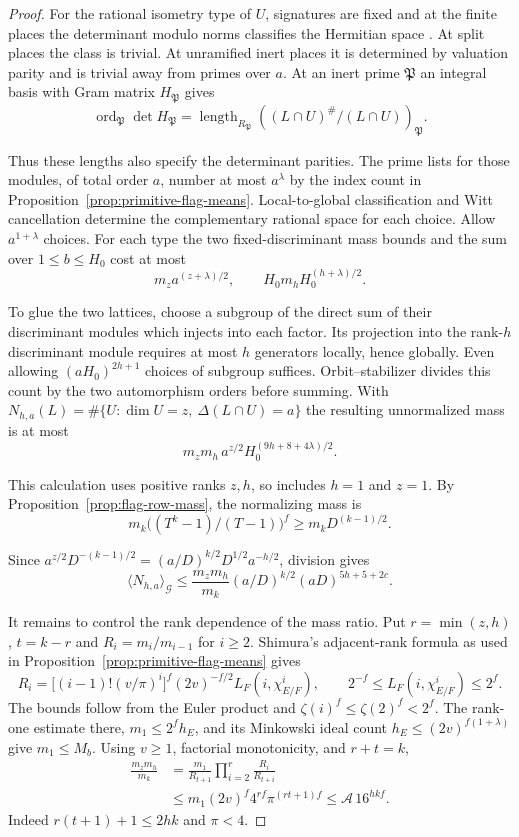 \begin{proof}
For the rational isometry type of \(U\), signatures are fixed and
at the finite places the determinant modulo norms classifies the
Hermitian space \cite{landherr}. At split places the class is trivial. At unramified
inert places it is determined by valuation parity and is trivial
away from primes over \(a\). At an inert prime \(\mathfrak P\)
an integral basis with Gram matrix \(H_{\mathfrak P}\) gives
\[
 \operatorname{ord}_{\mathfrak P}\det H_{\mathfrak P}
 =\operatorname{length}_{R_{\mathfrak P}}
     ((L\cap U)^\#/(L\cap U))_{\mathfrak P}.
\]

Thus these lengths also specify the determinant parities. The prime lists for those modules, of
total order \(a\), number at most \(a^\lambda\) by the index
count in Proposition~\ref{prop:primitive-flag-means}.
Local-to-global classification and Witt cancellation determine the
complementary rational space for each choice. Allow \(a^{1+\lambda}\)
choices. For each type the two fixed-discriminant mass bounds and
the sum over \(1\le b\le H_0\) cost at most
\[
          m_z a^{(z+\lambda)/2},\qquad
          H_0 m_h H_0^{(h+\lambda)/2}.
\]

To glue the two lattices, choose a subgroup of the direct sum of
their discriminant modules which injects into each factor. Its
projection into the rank-\(h\) discriminant module requires at most
\(h\) generators locally, hence globally. Even allowing
\((aH_0)^{2h+1}\) choices of subgroup suffices. Orbit--stabilizer
divides this count by the two automorphism orders before summing.
With \(N_{h,a}(L)=\#\{U:\dim U=z,\ \Delta(L\cap U)=a\}\)
the resulting unnormalized mass is at most
\[
 m_zm_h\,a^{z/2}H_0^{(9h+8+4\lambda)/2}.
\]

This calculation uses positive ranks \(z,h\), so includes \(h=1\)
and \(z=1\). By Proposition~\ref{prop:flag-row-mass},
the normalizing mass is
\[
     m_k\big((T^k-1)/(T-1)\big)^f\ge m_kD^{(k-1)/2}.
\]

Since \(a^{z/2} D^{-(k-1)/2}=(a/D)^{k/2}D^{1/2}a^{-h/2}\),
division gives
\[
 \langle N_{h,a}\rangle_{\mathcal G}
   \le \frac{m_zm_h}{m_k}(a/D)^{k/2}(aD)^{5h+5+2c}.
\]

It remains to control the rank dependence of the mass ratio. Put \(r=\min(z,h)\), \(t=k-r\) and \(R_i=m_i/m_{i-1}\)
for \(i\ge2\). Shimura's adjacent-rank formula as used in
Proposition~\ref{prop:primitive-flag-means} gives
\[
 R_i=\big[(i-1)!(v/\pi)^i\big]^f(2v)^{-f/2}
        L_F(i,\chi_{E/F}^i),\qquad
 2^{-f}\le L_F(i,\chi_{E/F}^i)\le2^f .
\]
The bounds follow from the Euler product and
\(\zeta(i)^f\le\zeta(2)^f<2^f\). The rank-one estimate there,
\(m_1\le2^fh_E\), and its Minkowski ideal count
\(h_E\le(2v)^{f(1+\lambda)}\) give \(m_1\le M_b\).
Using \(v\ge1\), factorial monotonicity, and \(r+t=k\),
\[
 \begin{aligned}
  \frac{m_zm_h}{m_k}
     &=\frac{m_1}{R_{t+1}}\prod_{i=2}^r\frac{R_i}{R_{t+i}}\\
     &\le m_1(2v)^f4^{rf}\pi^{(rt+1)f}
       \le \mathcal A\,16^{hkf}.
 \end{aligned}
\]
Indeed \(r(t+1)+1\le2hk\) and \(\pi<4\).


\end{proof}
